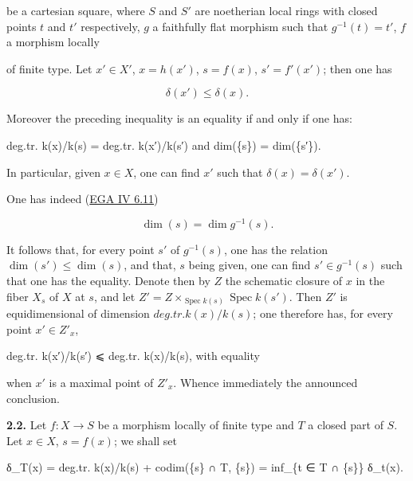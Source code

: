 \documentclass[
  11pt,
  a4paper,
]{book}
\newenvironment{Shaded}{}{}
\newcommand{\NormalTok}[1]{#1}
\begin{document}
be a cartesian square, where \(S\) and \(S'\) are noetherian local rings
with closed points \(t\) and \(t'\) respectively, \(g\) a faithfully
flat morphism such that \(g^{-1}(t) = t'\), \(f\) a morphism locally

of finite type. Let \(x' \in X'\), \(x = h(x')\), \(s = f(x)\),
\(s' = f'(x')\); then one has

\[ \delta(x') \leqslant \delta(x). \]

Moreover the preceding inequality is an equality if and only if one has:

\begin{Shaded}
\begin{Highlighting}[]
\NormalTok{deg.tr. k(x)/k(s) = deg.tr. k(x′)/k(s′)   and   dim(\{s\}) = dim(\{s′\}).}
\end{Highlighting}
\end{Shaded}

In particular, given \(x \in X\), one can find \(x'\) such that
\(\delta(x) = \delta(x')\).

One has indeed
(\href{https://jcreinhold.github.io/ega/iv/18-ch4-06-flat-morphisms.html\#611-criteria-for-the-sets-usnf-or-ucnf-to-be-open}{EGA
IV 6.11})

\[ \dim({s}) = \dim g^{-1}({s}). \]

It follows that, for every point \(s'\) of \(g^{-1}(s)\), one has the
relation \(\dim({s'}) \leqslant \dim({s})\), and that, \(s\) being
given, one can find \(s' \in g^{-1}(s)\) such that one has the equality.
Denote then by \(Z\) the schematic closure of \(x\) in the fiber
\(X_{s}\) of \(X\) at \(s\), and let
\(Z' = Z \times_{\operatorname{Spec} k(s)} \operatorname{Spec}
k(s')\). Then \(Z'\) is equidimensional of dimension
\(deg.tr. k(x)/k(s)\); one therefore has, for every point \(x' \in
Z'_{x}\),

\begin{Shaded}
\begin{Highlighting}[]
\NormalTok{deg.tr. k(x′)/k(s′) ⩽ deg.tr. k(x)/k(s),  with equality}
\end{Highlighting}
\end{Shaded}

when \(x'\) is a maximal point of \(Z'_{x}\). Whence immediately the
announced conclusion.

\textbf{2.2.} Let \(f : X \to S\) be a morphism locally of finite type
and \(T\) a closed part of \(S\). Let \(x \in X\), \(s = f(x)\); we
shall set

\begin{Shaded}
\begin{Highlighting}[]
\NormalTok{δ\_T(x) = deg.tr. k(x)/k(s) + codim(\{s\} ∩ T, \{s\}) = inf\_\{t ∈ T ∩ \{s\}\} δ\_t(x).}
\end{Highlighting}
\end{Shaded}
\end{document}
